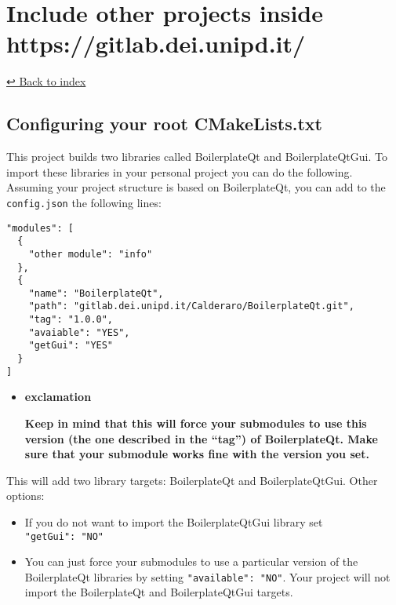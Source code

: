 \documentclass[
]{article}
\author{}
\date{}
\begin{document}
\hypertarget{header-n0}{%
\section{Include other projects inside
https://gitlab.dei.unipd.it/}\label{header-n0}}

\href{../home}{↩️ Back to index}

\hypertarget{header-n3}{%
\subsection{Configuring your root CMakeLists.txt}\label{header-n3}}

This project builds two libraries called BoilerplateQt and
BoilerplateQtGui. To import these libraries in your personal project you
can do the following. Assuming your project structure is based on
BoilerplateQt, you can add to the \texttt{config.json} the following
lines:

\begin{verbatim}
"modules": [
  {
    "other module": "info"
  },
  {
    "name": "BoilerplateQt",
    "path": "gitlab.dei.unipd.it/Calderaro/BoilerplateQt.git",
    "tag": "1.0.0",
    "avaiable": "YES",
    "getGui": "YES"
  }
]
\end{verbatim}

\begin{itemize}
\item
  \textbf{exclamation}

  \textbf{Keep in mind that this will force your submodules to use this
  version (the one described in the ``tag'') of BoilerplateQt. Make sure
  that your submodule works fine with the version you set.}
\end{itemize}

This will add two library targets: BoilerplateQt and BoilerplateQtGui.
Other options:

\begin{itemize}
\item
  If you do not want to import the BoilerplateQtGui library set
  \texttt{"getGui":\ "NO"}
\end{itemize}

\begin{itemize}
\item
  You can just force your submodules to use a particular version of the
  BoilerplateQt libraries by setting \texttt{"available":\ "NO"}. Your
  project will not import the BoilerplateQt and BoilerplateQtGui
  targets.
\end{itemize}
\end{document}
